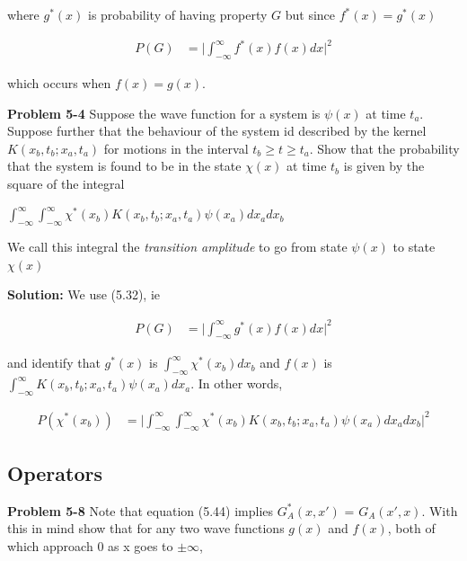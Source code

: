 \documentclass{article}
\begin{document}
where $g^{*}(x)$ is probability of having property $G$ but since $f^{*}(x) = g^{*}(x)$

\begin{align*}
         P(G) &= \bigg | \int_{-\infty}^{\infty}f^{*}(x)f(x)dx \bigg |^{2}
\end{align*}
 
which occurs when $f(x) = g(x)$.

\textbf{Problem 5-4}
Suppose the wave function for a system is $\psi (x)$ at time $t_{a}$. Suppose further that the behaviour of the system id described by the kernel $K(x_{b}, t_{b}; x_{a}, t_{a})$ for motions in the interval $t_{b} \geq t \geq t_{a}$. Show that the probability that the system is found to be in the state $\chi (x)$ at time $t_{b}$ is given by the square of the integral 

$\int_{-\infty}^{\infty}\int_{-\infty}^{\infty}\chi^{*}(x_{b})K(x_{b}, t_{b}; x_{a}, t_{a})\psi (x_{a})dx_{a}dx_{b}$

We call this integral the \textit{transition amplitude} to go from state $\psi(x)$ to state $\chi (x)$ 

\textbf{Solution:} 
We use (5.32), ie 

\begin{align*}
         P(G) &= \bigg | \int_{-\infty}^{\infty}g^{*}(x)f(x)dx \bigg |^{2}
\end{align*}

and identify that $g^{*}(x)$ is $\int_{-\infty}^{\infty}\chi^{*}(x_{b})dx_{b}$ and $f(x)$ is $\int_{-\infty}^{\infty}K(x_{b}, t_{b}; x_{a}, t_{a})\psi (x_{a})dx_{a}$. In other words, 

\begin{align*}
         P(\chi^{*}(x_{b})) &= \bigg | \int_{-\infty}^{\infty}\int_{-\infty}^{\infty}\chi^{*}(x_{b})K(x_{b}, t_{b}; x_{a}, t_{a})\psi (x_{a})dx_{a}dx_{b} \bigg |^{2}
\end{align*}
 


\subsection{}

\subsection{Operators}

\textbf{Problem 5-8} Note that equation (5.44) implies $G^{*}_{A}(x,x')$ = $G_{A}(x',x)$. With this in mind show that for any two wave functions $g(x)$ and $f(x)$, both of which approach 0 as x goes to $\pm \infty$, 
\end{document}
